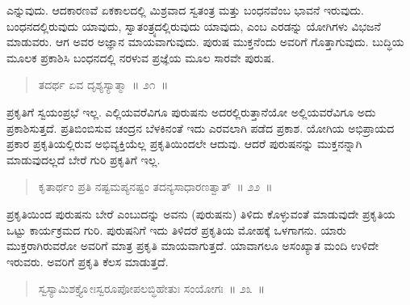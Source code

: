 ಎನ್ನುವುದು. ಆದಕಾರಣವೆ ಏಕಕಾಲದಲ್ಲಿ ಮಿಶ್ರವಾದ ಸ್ವತಂತ್ರ ಮತ್ತು ಬಂಧನವೆಂಬ ಭಾವನೆ ಇರುವುದು. ಬಂಧನದಲ್ಲಿರುವುದು ಯಾವುದು, ಸ್ವಾತಂತ್ರ್ಯದಲ್ಲಿರುವುದು ಯಾವುದು, ಎಂಬ ಎರಡನ್ನು ಯೋಗಿಗಳು ವಿಭಜನೆ ಮಾಡುವರು. ಆಗ ಅವರ ಅಜ್ಞಾನ ಮಾಯವಾಗುವುದು. ಪುರುಷ ಮುಕ್ತನೆಂದು ಅವರಿಗೆ ಗೊತ್ತಾಗುವುದು. ಬುದ್ಧಿಯ ಮೂಲಕ ಪ್ರಕಾಶಿಸಿ ಬಂಧನದಲ್ಲಿ ನರಳುವ ಪ್ರಜ್ಞೆಯ ಮೂಲ ಸಾರವೇ ಪುರುಷ. 

\vspace{-0.2cm}

\begin{verse}
ತದರ್ಥ ಏವ ದೃಶ್ಯಸ್ಯಾತ್ಮಾ~॥ ೨೧~॥
\end{verse}

\vspace{-0.4cm}


\vspace{0.2cm}

ಪ್ರಕೃತಿಗೆ ಸ್ವಯಂಪ್ರಭೆ ಇಲ್ಲ. ಎಲ್ಲಿಯವರೆವಿಗೂ ಪುರುಷನು ಅದರಲ್ಲಿರುತ್ತಾನೆಯೋ ಅಲ್ಲಿಯವರೆವಿಗೂ ಅದು ಪ್ರಕಾಶಿಸುತ್ತದೆ. ಪ್ರತಿಬಿಂಬಿಸುವ ಚಂದ್ರನ ಬೆಳಕಿನಂತೆ ಇದು ಎರವಲಾಗಿ ಪಡೆದ ಪ್ರಕಾಶ. ಯೋಗಿಯ ಅಭಿಪ್ರಾಯದ ಪ್ರಕಾರ ಪ್ರಕೃತಿಯಲ್ಲಿರುವ ಅಭಿವ್ಯಕ್ತಿಯೆಲ್ಲ ಪ್ರಕೃತಿಯಿಂದಲೇ ಆದುವು. ಆದರೆ ಪುರುಷನನ್ನು ಮುಕ್ತನನ್ನಾಗಿ ಮಾಡುವುದಲ್ಲದೆ ಬೇರೆ ಗುರಿ ಪ್ರಕೃತಿಗೆ ಇಲ್ಲ. 

\vspace{-0.2cm}

\begin{verse}
ಕೃತಾರ್ಥಂ ಪ್ರತಿ ನಷ್ಟಮಪ್ಯನಷ್ಟಂ ತದನ್ಯಸಾಧಾರಣತ್ವಾತ್​~॥ ೨೨~॥
\end{verse}

\vspace{-0.45cm}


\vspace{0.2cm}

ಪ್ರಕೃತಿಯಿಂದ ಪುರುಷನು ಬೇರೆ ಎಂಬುದನ್ನು ಅವನು (ಪುರುಷನು) ತಿಳಿದು ಕೊಳ್ಳುವಂತೆ ಮಾಡುವುದೇ ಪ್ರಕೃತಿಯ ಒಟ್ಟು ಕಾರ್ಯಕ್ರಮದ ಗುರಿ. ಪುರುಷನಿಗೆ ಇದು ತಿಳಿದರೆ ಪ್ರಕೃತಿಯ ಮೋಹಕ್ಕೆ ಒಳಗಾಗನು. ಯಾರು ಮುಕ್ತರಾಗಿರುವರೋ ಅವರಿಗೆ ಮಾತ್ರ ಪ್ರಕೃತಿ ಮಾಯವಾಗುತ್ತದೆ. ಯಾವಾಗಲೂ ಅಸಂಖ್ಯಾತ ಮಂದಿ ಉಳಿದೇ ಇರುವರು. ಅವರಿಗೆ ಪ್ರಕೃತಿ ಕೆಲಸ ಮಾಡುತ್ತದೆ. 

\vspace{-0.2cm}

\begin{verse}
ಸ್ವಸ್ಯಾಮಿಶಕ್ತ್ಯೋಃಸ್ವರೂಪೋಪಲಬ್ಧಿಹೇತುಃ ಸಂಯೋಗಃ~॥ ೨೩~॥
\end{verse}

\vspace{-0.45cm}



